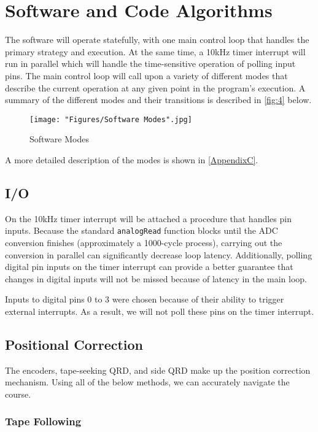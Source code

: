 \documentclass[11pt, oneside]{article} %
\begin{document}
\newpage
\section{Software and Code Algorithms}	
The software will operate statefully, with one main control loop that handles the primary strategy and execution. At the same time, a 10kHz timer interrupt will run in parallel which will handle the time-sensitive operation of polling input pins.
The main control loop will call upon a variety of different modes that describe the current operation at any given point in the program's execution. A summary of the different modes and their transitions is described in \autoref{fig:4} below.

\begin{figure}[h]
	\centering
	\texttt{[image: "Figures/Software Modes".jpg]}
	\caption[Software Modes]{Software Modes}
	\label{fig:4}
\end{figure}

A more detailed description of the modes is shown in \autoref{AppendixC}.
	
	\subsection{I/O}
	
	On the 10kHz timer interrupt will be attached a procedure that handles pin inputs. Because the standard \texttt{analogRead} function blocks until the ADC conversion finishes (approximately a 1000-cycle process), carrying out the conversion in parallel can significantly decrease loop latency. Additionally, polling digital pin inputs on the timer interrupt can provide a better guarantee that changes in digital inputs will not be missed because of latency in the main loop.
	
	Inputs to digital pins 0 to 3 were chosen because of their ability to trigger external interrupts. As a result, we will not poll these pins on the timer interrupt.
	
	\subsection{Positional Correction}
	
	The encoders, tape-seeking QRD, and side QRD make up the position correction mechanism. Using all of the below methods, we can accurately navigate the course.
	
		\subsubsection{Tape Following}
		
\end{document}
